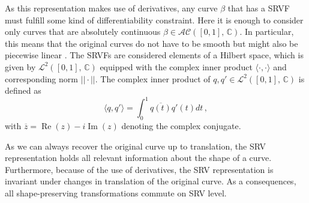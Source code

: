 \noindent As this representation makes use of derivatives, any curve $\beta$ that has a SRVF must fulfill some kind of differentiability constraint.
Here it is enough to consider only curves that are absolutely continuous $\beta \in \mathcal{AC}([0,1],\, \mathbb{C})$.
In particular, this means that the original curves do not have to be smooth but might also be piecewise linear \parencite[see][91]{SrivastavaKlassen2016}.
The SRVFs are considered elements of a Hilbert space, which is given by $\mathcal{L}^2([0,1],\,\mathbb{C})$ equipped with the complex inner product $\langle \cdot, \cdot \rangle$ and corresponding norm $||\cdot||$.
The complex inner product of $q,q' \in \mathcal{L}^2([0,1],\,\mathbb{C})$ is defined as
$$ \langle q, q' \rangle = \int_0^1 \overline{q(t)} q'(t) dt \,, $$
with $\overline{z} = \operatorname{Re}(z) - i \operatorname{Im}(z)$ denoting the complex conjugate.

As we can always recover the original curve up to translation, the SRV representation holds all relevant information about the shape of a curve.
Furthermore, because of the use of derivatives, the SRV representation is invariant under changes in translation of the original curve.
As a consequences, all shape-preserving transformations commute on SRV level.


